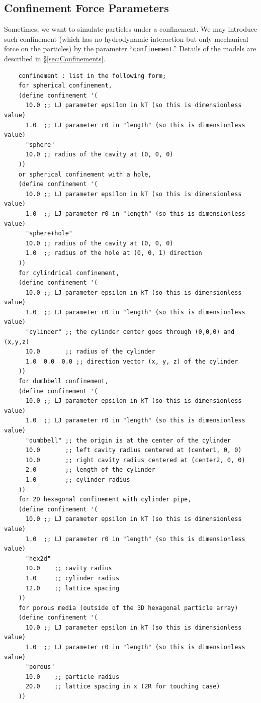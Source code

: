 \documentclass{book}
\begin{document}
\subsection{Confinement Force Parameters}
Sometimes, we want to simulate particles under a confinement. 
We may introduce such confinement (which has no hydrodynamic interaction 
but only mechanical force on the particles) 
by the parameter ``{\tt confinement}.'' 
Details of the models are described in 
\S \ref{sec:Confinements}. 

{\small
\begin{verbatim}
	confinement : list in the following form;
	for spherical confinement,
	(define confinement '(
	  10.0 ;; LJ parameter epsilon in kT (so this is dimensionless value)
	  1.0  ;; LJ parameter r0 in "length" (so this is dimensionless value)
	  "sphere"
	  10.0 ;; radius of the cavity at (0, 0, 0)
	))
	or spherical confinement with a hole,
	(define confinement '(
	  10.0 ;; LJ parameter epsilon in kT (so this is dimensionless value)
	  1.0  ;; LJ parameter r0 in "length" (so this is dimensionless value)
	  "sphere+hole"
	  10.0 ;; radius of the cavity at (0, 0, 0)
	  1.0  ;; radius of the hole at (0, 0, 1) direction
	))
	for cylindrical confinement,
	(define confinement '(
	  10.0 ;; LJ parameter epsilon in kT (so this is dimensionless value)
	  1.0  ;; LJ parameter r0 in "length" (so this is dimensionless value)
	  "cylinder" ;; the cylinder center goes through (0,0,0) and (x,y,z)
	  10.0       ;; radius of the cylinder
	  1.0  0.0  0.0 ;; direction vector (x, y, z) of the cylinder
	))
	for dumbbell confinement,
	(define confinement '(
	  10.0 ;; LJ parameter epsilon in kT (so this is dimensionless value)
	  1.0  ;; LJ parameter r0 in "length" (so this is dimensionless value)
	  "dumbbell" ;; the origin is at the center of the cylinder
	  10.0       ;; left cavity radius centered at (center1, 0, 0)
	  10.0       ;; right cavity radius centered at (center2, 0, 0)
	  2.0        ;; length of the cylinder
	  1.0        ;; cylinder radius
	))
	for 2D hexagonal confinement with cylinder pipe,
	(define confinement '(
	  10.0 ;; LJ parameter epsilon in kT (so this is dimensionless value)
	  1.0  ;; LJ parameter r0 in "length" (so this is dimensionless value)
	  "hex2d"
	  10.0    ;; cavity radius
	  1.0     ;; cylinder radius
	  12.0    ;; lattice spacing
	))
	for porous media (outside of the 3D hexagonal particle array)
	(define confinement '(
	  10.0 ;; LJ parameter epsilon in kT (so this is dimensionless value)
	  1.0  ;; LJ parameter r0 in "length" (so this is dimensionless value)
	  "porous"
	  10.0    ;; particle radius
	  20.0    ;; lattice spacing in x (2R for touching case)
	))
\end{verbatim}
}
\end{document}

